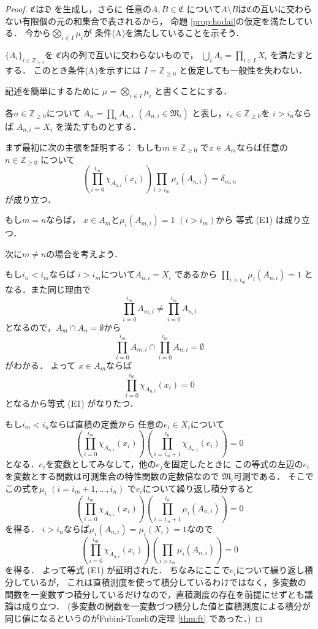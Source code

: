 \documentclass[leqno, a4paper, 12pt]{jsarticle}
\newcommand{\zz}{\mathbb{Z}}
\begin{document}
\begin{proof}
$\mathfrak{C}$は$\mathfrak{D}$
を生成し，さらに
任意の$A, B\in \mathfrak{C}$
について$A\setminus B$は$\mathfrak{C}$の互いに交わらない有限個の元の和集合で表されるから，
命題 \ref{prop:hodai}の仮定を満たしている．
今から$\bigotimes_{i\in I}\mu_{i}$が
条件(A)を満たしていることを示そう．

$\{A_{i}\}_{i\in \zz_{\ge 0}}$を
$\mathfrak{C}$内の列で互いに交わらないもので，
$\bigcup_{i}A_{i}=\prod_{i\in I}X_{i}$
を満たすとする．
このとき条件(A)を示すには
$I=\zz_{\ge 0}$
と仮定しても一般性を失わない．

記述を簡単にするために
$\mu=\bigotimes_{i\in I}\mu_{i}$
と書くことにする．

各$n\in \zz_{\ge 0}$について
$A_{n}=\prod_{i}A_{n, i}$
$(A_{n, i}\in \mathfrak{M}_{i})$
と表し，$i_{n}\in \zz_{\ge 0}$を
$i>i_{n}$ならば
$A_{n, i}=X_{i}$
を満たすものとする．

まず最初に次の主張を証明する：
もしも$m\in \zz_{\ge 0}$
で$x\in A_{m}$ならば任意の$n\in \zz_{\ge 0}$
について
\begin{equation}
\tag{E1}
\left(
\prod_{i=0}^{i_{m}}\chi_{A_{n, i}}(x_{i})
\right)
\prod_{i>i_{m}}\mu_{i}(A_{n, i})
=\delta_{m, n}
\end{equation}
が成り立つ．

もし$m=n$ならば，
$x\in A_{m}$と$\mu_{i}(A_{m, i})=1$ $(i>i_{m})$から
等式 (E1) は成り立つ．

次に$m\neq n$の場合を考えよう．

もし$i_{n}<i_{m}$ならば
$i>i_{m}$について$A_{n, i}=X_{i}$
であるから
$\prod_{i>i_{m}}\mu_{i}(A_{n, i})=1$
となる．また同じ理由で
\[
\prod_{i=0}^{i_{m}}A_{m, i}
\neq
\prod_{i=0}^{i_{m}}A_{n, i}
\]
となるので，$A_{m}\cap A_{n}=\emptyset$から
\[
\prod_{i=0}^{i_{m}}A_{m, i}
\cap
\prod_{i=0}^{i_{m}}A_{n, i}=\emptyset
\]
がわかる．
よって
$x\in A_{m}$ならば
\[
\prod_{i=0}^{i_{m}}\chi_{A_{n, i}}(x_{i})=0
\]
となるから等式 (E1) がなりたつ．

もし$i_{m}<i_{n}$ならば直積の定義から
任意の$e_{i}\in X_{i}$について
\[
\left(
\prod_{i=0}^{i_{m}}\chi_{A_{n, i}}(x_{i})
\right)
\left(
\prod_{i=i_{m}+1}^{i_{n}}\chi_{A_{n, i}}(e_{i})
\right)=0
\]
となる．$e_{i}$を変数としてみなして，他の$e_{j}$を固定したときに この等式の左辺の$e_{i}$を変数とする関数は可測集合の特性関数の定数倍なので
$\mathfrak{M}_{i}$可測である．
そこでこの式を$\mu_{i}$ $(i=i_{m}+1, \dots, i_{n})$
で$e_{i}$について繰り返し積分すると
\[
\left(
\prod_{i=0}^{i_{m}}\chi_{A_{n, i}}(x_{i})
\right)
\left(
\prod_{i=i_{m}+1}^{i_{n}}\mu_{i}({A_{n, i}})
\right)=0
\]
を得る．
$i>i_{n}$ならば$\mu_{i}(A_{n, i})=\mu_{i}(X_{i})=1$なので
\[
\left(
\prod_{i=0}^{i_{m}}\chi_{A_{n, i}}(x_{i})
\right)
\left(
\prod_{i>i_{m}}\mu_{i}({A_{n, i}})
\right)=0
\]
を得る．
よって等式  (E1) が証明された．
ちなみにここで$e_{i}$について繰り返し積分しているが，
これは直積測度を使って積分しているわけではなく，多変数の関数を一変数ずつ積分しているだけなので，直積測度の存在を前提にせずとも議論は成り立つ．
(多変数の関数を一変数づつ積分した値と直積測度による積分が同じ値になるというのがFubini-Toneliの定理 \ref{thm:ft} であった．)


\end{proof}
\end{document}
